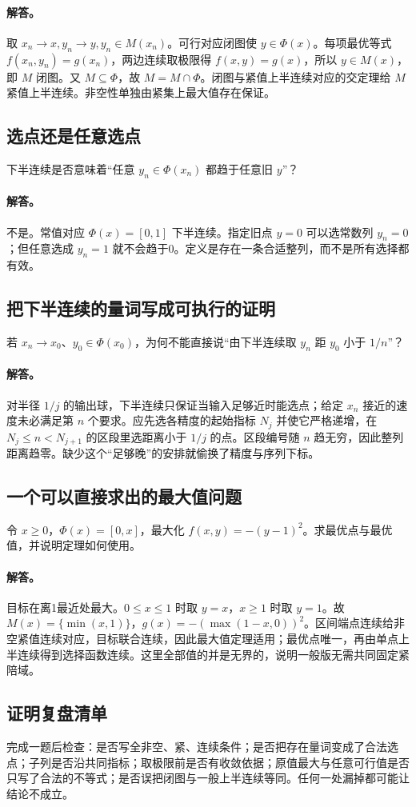 \paragraph{解答。}取 $x_n\to x,y_n\to y,y_n\in M(x_n)$。可行对应闭图使 $y\in\Phi(x)$。每项最优等式 $f(x_n,y_n)=g(x_n)$，两边连续取极限得 $f(x,y)=g(x)$，所以 $y\in M(x)$，即 $M$ 闭图。又 $M\subseteq\Phi$，故 $M=M\cap\Phi$。闭图与紧值上半连续对应的交定理给 $M$ 紧值上半连续。非空性单独由紧集上最大值存在保证。
\subsection{选点还是任意选点}
下半连续是否意味着“任意 $y_n\in\Phi(x_n)$ 都趋于任意旧 $y$”？
\paragraph{解答。}不是。常值对应 $\Phi(x)=[0,1]$ 下半连续。指定旧点 $y=0$ 可以选常数列 $y_n=0$；但任意选成 $y_n=1$ 就不会趋于0。定义是存在一条合适整列，而不是所有选择都有效。
\subsection{把下半连续的量词写成可执行的证明}
若 $x_n\to x_0$、$y_0\in\Phi(x_0)$，为何不能直接说“由下半连续取 $y_n$ 距 $y_0$ 小于 $1/n$”？
\paragraph{解答。}对半径 $1/j$ 的输出球，下半连续只保证当输入足够近时能选点；给定 $x_n$ 接近的速度未必满足第 $n$ 个要求。应先选各精度的起始指标 $N_j$ 并使它严格递增，在 $N_j\le n<N_{j+1}$ 的区段里选距离小于 $1/j$ 的点。区段编号随 $n$ 趋无穷，因此整列距离趋零。缺少这个“足够晚”的安排就偷换了精度与序列下标。
\subsection{一个可以直接求出的最大值问题}
令 $x\ge0$，$\Phi(x)=[0,x]$，最大化 $f(x,y)=-(y-1)^2$。求最优点与最优值，并说明定理如何使用。
\paragraph{解答。}目标在离1最近处最大。$0\le x\le1$ 时取 $y=x$，$x\ge1$ 时取 $y=1$。故 $M(x)=\{\min(x,1)\}$，$g(x)=-(\max(1-x,0))^2$。区间端点连续给非空紧值连续对应，目标联合连续，因此最大值定理适用；最优点唯一，再由单点上半连续得到选择函数连续。这里全部值的并是无界的，说明一般版无需共同固定紧陪域。
\subsection{证明复盘清单}
完成一题后检查：是否写全非空、紧、连续条件；是否把存在量词变成了合法选点；子列是否沿共同指标；取极限前是否有收敛依据；原值最大与任意可行值是否只写了合法的不等式；是否误把闭图与一般上半连续等同。任何一处漏掉都可能让结论不成立。
